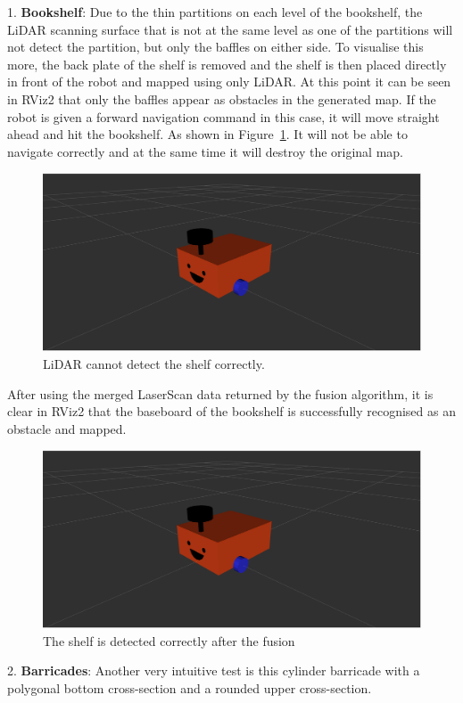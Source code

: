 1. \textbf{Bookshelf}: Due to the thin partitions on each level of the bookshelf, 
the LiDAR scanning surface that is not at the same level as one of the partitions will not detect the partition, 
but only the baffles on either side. To visualise this more, the back plate of the shelf is removed 
and the shelf is then placed directly in front of the robot and mapped using only LiDAR. 
At this point it can be seen in RViz2 that only the baffles appear as obstacles in the generated map. 
If the robot is given a forward navigation command in this case, it will move straight ahead and hit the bookshelf. 
As shown in Figure~\ref{fig:bookshelf}. It will not be able to navigate correctly and at the same time it will destroy the original map.
\begin{figure}[H]
    \centering
    \includegraphics[width=0.8\linewidth]{figs/robot.png}
    \caption{LiDAR cannot detect the shelf correctly.}
    \label{fig:bookshelf}
\end{figure}
After using the merged LaserScan data returned by the fusion algorithm, 
it is clear in RViz2 that the baseboard of the bookshelf is successfully recognised as an obstacle and mapped.
\begin{figure}[H]
    \centering
    \includegraphics[width=0.8\linewidth]{figs/robot.png}
    \caption{The shelf is detected correctly after the fusion}
\end{figure}
2. \textbf{Barricades}: Another very intuitive test is this cylinder barricade 
with a polygonal bottom cross-section and a rounded upper cross-section.
